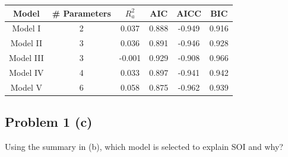 \documentclass[
  10pt,
]{extarticle}
\newenvironment{Shaded}{\begin{snugshade}}{\end{snugshade}}
\newcommand{\AttributeTok}[1]{\textcolor[rgb]{0.13,0.29,0.53}{#1}}
\newcommand{\DecValTok}[1]{\textcolor[rgb]{0.00,0.00,0.81}{#1}}
\newcommand{\FunctionTok}[1]{\textcolor[rgb]{0.13,0.29,0.53}{\textbf{#1}}}
\newcommand{\NormalTok}[1]{#1}
\newcommand{\OtherTok}[1]{\textcolor[rgb]{0.56,0.35,0.01}{#1}}
\newcommand{\SpecialCharTok}[1]{\textcolor[rgb]{0.81,0.36,0.00}{\textbf{#1}}}
\newcommand{\StringTok}[1]{\textcolor[rgb]{0.31,0.60,0.02}{#1}}
\begin{document}
\begin{Shaded}
\end{Shaded}

\begin{table}[H]
\centering
\begin{tabular}{cccccc}
\toprule
Model & \# Parameters & $R_a^2$ & AIC & AICC & BIC\\
\midrule
Model I & 2 & 0.037 & 0.888 & -0.949 & 0.916\\
Model II & 3 & 0.036 & 0.891 & -0.946 & 0.928\\
Model III & 3 & -0.001 & 0.929 & -0.908 & 0.966\\
Model IV & 4 & 0.033 & 0.897 & -0.941 & 0.942\\
Model V & 6 & 0.058 & 0.875 & -0.962 & 0.939\\
\bottomrule
\end{tabular}
\end{table}

\newpage

\subsection{Problem 1 (c)}\label{problem-1-c}

\begin{problem}[Problem 1 (c)]
Using the summary in (b), which model is selected to explain SOI and why?
\end{problem}
\end{document}
